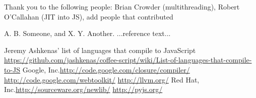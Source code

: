 \documentclass[11pt]{proc}
\begin{document}


Thank you to the following people: Brian Crowder (multithreading), Robert O'Callahan (JIT into JS), add people that contributed





\begin{thebibliography}{}

A. B. Someone, and X. Y. Another. ...reference text...

Jeremy Ashkenas' list of languages that compile to JavaScript \url{https://github.com/jashkenas/coffee-script/wiki/List-of-languages-that-compile-to-JS}
Google, Inc.\url{http://code.google.com/closure/compiler/}
\url{http://code.google.com/webtoolkit/}
\url{http://llvm.org/}
Red Hat, Inc.\url{http://sourceware.org/newlib/}
\url{http://pyjs.org/}
\end{thebibliography}
\end{document}
